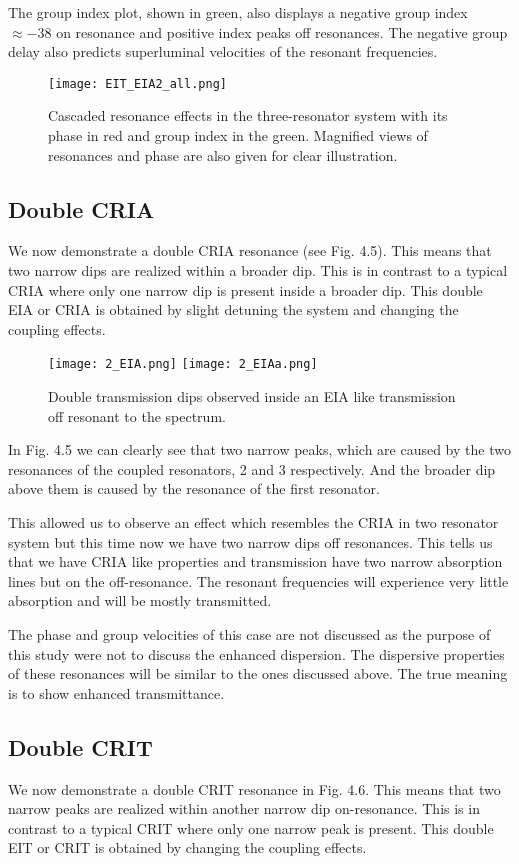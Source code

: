 The group index plot, shown in green, also displays a negative group index $\approx -38$ on resonance and positive index peaks off resonances. The negative group delay also predicts superluminal velocities of the resonant frequencies.
\newpage
\begin{figure}[h]
\centering
\texttt{[image: EIT\_EIA2\_all.png]}
\caption{Cascaded resonance effects in the three-resonator system with its phase in red and group index in the green. Magnified views of resonances and phase are also given for clear illustration.}
\end{figure}

\subsection{Double CRIA}
We now demonstrate a double CRIA resonance (see Fig. 4.5). This means that two narrow dips are realized within a broader dip. This is in contrast to a typical CRIA where only one narrow dip is present inside a broader dip. This double EIA or CRIA is obtained by slight detuning the system and changing the coupling effects. 


\begin{figure}[t]
\centering
\texttt{[image: 2\_EIA.png]}
\texttt{[image: 2\_EIAa.png]}
\caption{Double transmission dips observed inside an EIA like transmission off resonant to the spectrum.}
\end{figure}

In Fig. 4.5 we can clearly see that two narrow peaks, which are caused by the two resonances of the coupled resonators, 2 and 3 respectively. And the broader dip above them is caused by the resonance of the first resonator. 


This allowed us to observe an effect which resembles the CRIA in two resonator system but this time now we have two narrow dips off resonances. This tells us that we have CRIA like properties and transmission have two narrow absorption lines but on the off-resonance. The resonant frequencies will experience very little absorption and will be mostly transmitted. 

The phase and group velocities of this case are not discussed as the purpose of this study were not to discuss the enhanced dispersion. The dispersive properties of these resonances will be similar to the ones discussed above. The true meaning is to show enhanced transmittance.


\subsection{Double CRIT}
We now demonstrate a double CRIT resonance in Fig. 4.6. This means that two narrow peaks are realized within another narrow dip on-resonance. This is in contrast to a typical CRIT where only one narrow peak is present. This double EIT or CRIT is obtained by changing the coupling effects. 

